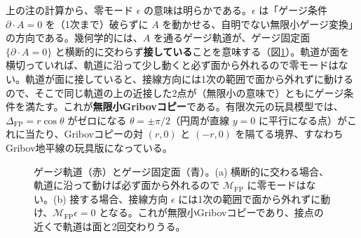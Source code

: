 \documentclass[uplatex, dvipdfmx, book]{jsbook}
\begin{document}
上の注の計算から、零モード $\epsilon$ の意味は明らかである。$\epsilon$ は「ゲージ条件 $\partial \cdot A = 0$ を（1次まで）破らずに $A$ を動かせる、自明でない無限小ゲージ変換」の方向である。幾何学的には、$A$ を通るゲージ軌道が、ゲージ固定面 $\{\partial \cdot A = 0\}$ と横断的に交わらず\textbf{接している}ことを意味する（図\ref{fig:gribov-tangent}）。軌道が面を横切っていれば、軌道に沿って少し動くと必ず面から外れるので零モードはない。軌道が面に接していると、接線方向には1次の範囲で面から外れずに動けるので、そこで同じ軌道の上の近接した2点が（無限小の意味で）ともにゲージ条件を満たす。これが\textbf{無限小Gribovコピー}である。有限次元の玩具模型では、$\Delta_{\mathrm{FP}} = r\cos\theta$ がゼロになる $\theta = \pm\pi/2$（円周が直線 $y = 0$ に平行になる点）がこれに当たり、Gribovコピーの対 $(r, 0)$ と $(-r, 0)$ を隔てる境界、すなわちGribov地平線の玩具版になっている。

\begin{figure}[htbp]
\centering
{}
\caption{ゲージ軌道（赤）とゲージ固定面（青）。(a) 横断的に交わる場合、軌道に沿って動けば必ず面から外れるので $\mathcal{M}_{\mathrm{FP}}$ に零モードはない。(b) 接する場合、接線方向 $\epsilon$ には1次の範囲で面から外れずに動け、$\mathcal{M}_{\mathrm{FP}}\epsilon = 0$ となる。これが無限小Gribovコピーであり、接点の近くで軌道は面と2回交わりうる。}
\label{fig:gribov-tangent}
\end{figure}
\end{document}
